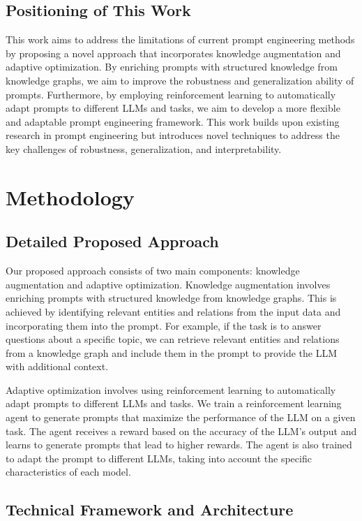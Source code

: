 \documentclass{article}
\begin{document}
\subsection{Positioning of This Work}

This work aims to address the limitations of current prompt engineering methods by proposing a novel approach that incorporates knowledge augmentation and adaptive optimization. By enriching prompts with structured knowledge from knowledge graphs, we aim to improve the robustness and generalization ability of prompts. Furthermore, by employing reinforcement learning to automatically adapt prompts to different LLMs and tasks, we aim to develop a more flexible and adaptable prompt engineering framework. This work builds upon existing research in prompt engineering but introduces novel techniques to address the key challenges of robustness, generalization, and interpretability.

\section{Methodology}

\subsection{Detailed Proposed Approach}

Our proposed approach consists of two main components: knowledge augmentation and adaptive optimization. Knowledge augmentation involves enriching prompts with structured knowledge from knowledge graphs. This is achieved by identifying relevant entities and relations from the input data and incorporating them into the prompt. For example, if the task is to answer questions about a specific topic, we can retrieve relevant entities and relations from a knowledge graph and include them in the prompt to provide the LLM with additional context.

Adaptive optimization involves using reinforcement learning to automatically adapt prompts to different LLMs and tasks. We train a reinforcement learning agent to generate prompts that maximize the performance of the LLM on a given task. The agent receives a reward based on the accuracy of the LLM's output and learns to generate prompts that lead to higher rewards. The agent is also trained to adapt the prompt to different LLMs, taking into account the specific characteristics of each model.

\subsection{Technical Framework and Architecture}
\end{document}

